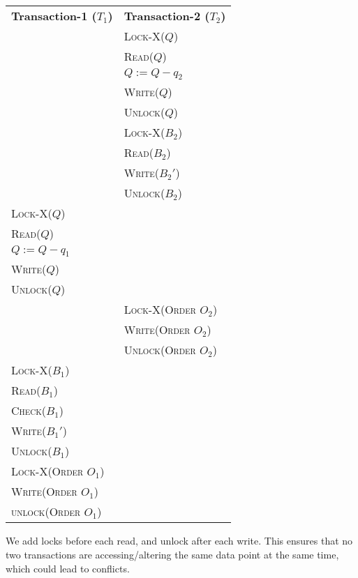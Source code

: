 \begin{center}
    \begin{adjustbox}{width=\textwidth}
        \begin{tabularx}{\textwidth}{|X|X|}
        \hline
        \multirow{2}{*}{\textbf{Transaction-1 ($T_{1}$)}} & \multirow{2}{*}{\textbf{Transaction-2 ($T_{2}$)}} \\
        & \\ \hline
        & \textsc{Lock-X($Q$)} \\
        & \textsc{Read($Q$)} \\
        & \textsc{$Q := Q - q_{2}$} \\
        & \textsc{Write($Q$)} \\
        & \textsc{Unlock($Q$)} \\
        & \textsc{Lock-X($B_{2}$)} \\
        & \textsc{Read($B_{2}$)} \\
        & \textsc{Write($B_{2}'$)} \\
        & \textsc{Unlock($B_{2}$)} \\
        \textsc{Lock-X($Q$)} & \\
        \textsc{Read($Q$)} & \\
        \textsc{$Q := Q - q_{1}$} & \\
        \textsc{Write($Q$)} & \\
        \textsc{Unlock($Q$)} & \\
        & \textsc{Lock-X(Order $O_{2}$)} \\
        & \textsc{Write(Order $O_{2}$)} \\
        & \textsc{Unlock(Order $O_{2}$)} \\
        \textsc{Lock-X($B_{1}$)} & \\
        \textsc{Read($B_{1}$)} & \\
        \textsc{Check($B_{1}$)} & \\
        \textsc{Write($B_{1}'$)} & \\
        \textsc{Unlock($B_{1}$)} & \\
        \textsc{Lock-X(Order $O_{1}$)} & \\
        \textsc{Write(Order $O_{1}$)} & \\
        \textsc{unlock(Order $O_{1}$)} & \\
        \hline
        \end{tabularx}
    \end{adjustbox}
\end{center}
\vspace*{10pt}
We add locks before each read, and unlock after each write.
This ensures that no two transactions are accessing/altering the same data point at the same time,
which could lead to conflicts.